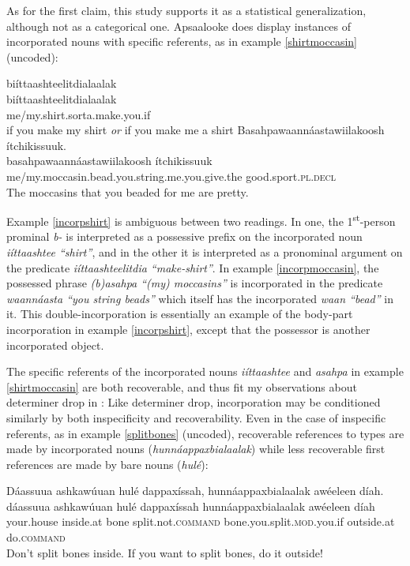 \documentclass[output=paper]{LSP/langsci}
\begin{document}
As for the first claim, this study supports it as a statistical generalization, although not as a categorical one. Apsaalooke does display instances of incorporated nouns with specific referents, as in example \ref{shirtmoccasin} (uncoded):

\ea\label{shirtmoccasin}
\ea\label{incorpshirt}
biíttaashteelitdialaalak\footnotemark\\
\gll	biíttaashteelitdialaalak\\
	me/my.shirt.sorta.make.you.if\\
\glt	if you make my shirt \emph{or} if you make me a shirt
\ex\label{incorpmoccasin}
Basahpawaannáastawiilakoosh ítchikissuuk.\footnotemark\\
\gll	basahpawaannáastawiilakoosh					ítchikissuuk\\
	me/my.moccasin.bead.you.string.me.you.give.the 		good.sport.\textsc{pl.decl}\\
\glt	The moccasins that you beaded for me are pretty. 
\z\z

Example \ref{incorpshirt} is ambiguous between two readings. In one, the 1\textsuperscript{st}-person prominal \emph{b-} is interpreted as a possessive prefix on the incorporated noun  \emph{iíttaashtee “shirt”}, and in the other it is interpreted as a pronominal argument on the predicate \emph{iíttaashteelitdia “make-shirt”}. In example \ref{incorpmoccasin}, the possessed phrase \emph{(b)asahpa “(my) moccasins”} is incorporated in the predicate \emph{waannáasta “you string beads”} which itself has the incorporated \emph{waan “bead”} in it. This double-incorporation is essentially an example of the body-part incorporation in example \ref{incorpshirt}, except that the possessor is another incorporated object.

	The specific referents of the incorporated nouns \emph{iíttaashtee} and \emph{asahpa} in example \ref{shirtmoccasin} are both recoverable, and thus fit my observations about determiner drop in : Like determiner drop, incorporation may be conditioned similarly by both inspecificity and recoverability. Even in the case of inspecific referents, as in example \ref{splitbones} (uncoded), recoverable references to types are made by incorporated nouns (\emph{‎hunnáappaxbialaalak}) while less recoverable first references are made by bare nouns (\emph{hulé}):
	 
\ea\label{splitbones}
 	Dáassuua ashkawúuan hulé dappaxíssah, hunnáappaxbialaalak awéeleen díah.\footnotemark\\
\gll	dáassuua		ashkawúuan		hulé		dappaxíssah				hunnáappaxbialaalak			awéeleen		díah\\
	your.house		inside.at		bone		split.not.\textsc{command}	bone.you.split.\textsc{mod}.you.if	outside.at		do.\textsc{command}\\
\glt	Don’t split bones inside. If you want to split bones, do it outside! 
\z
\end{document}
